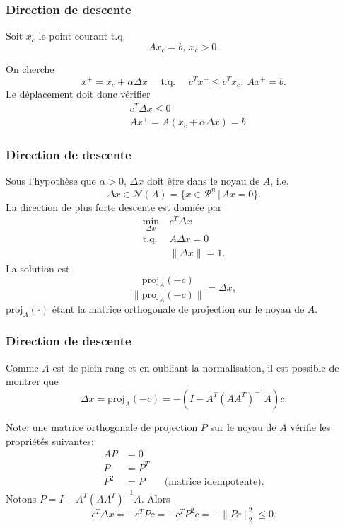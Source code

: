 \documentclass[t,usepdftitle=false]{beamer}
\def\cN{\mathcal{N}}
\def\RR {\mathcal{R}}
\begin{document}
\begin{frame}
	\frametitle{Direction de descente}
	
	Soit $x_c$ le point courant t.q.
	$$
	Ax_c = b, \ x_c > 0.
	$$

	On cherche
	$$
	x^+ = x_c + \alpha \Delta x \quad \text{ t.q. }\quad 
	c^Tx^+ \leq c^T x_c,\ Ax^+ = b.
	$$
	Le déplacement doit donc vérifier
	\begin{align*}
		& c^T \Delta x \leq 0 \\
		& Ax^+ = A(x_c + \alpha \Delta x) = b
	\end{align*}
	
\end{frame}

\begin{frame}
	\frametitle{Direction de descente}
	
	Sous l'hypothèse que $\alpha > 0$, $\Delta x$ doit être dans le noyau de $A$, i.e.
	$$
	\Delta x \in \cN(A) = \{x \in \RR^n \,|\, Ax = 0 \}.
	$$
	La direction de plus forte descente est donnée par
	\begin{align*}
		\min_{\Delta x}\ & c^T\Delta x \\
		\mbox{t.q. } & A \Delta x = 0 \\
		& \| \Delta x \| = 1.
	\end{align*}
	La solution est
	$$
	\frac{\text{proj}_A(-c)}{\| \text{proj}_A (-c) \|} = \Delta x,
	$$
	$\text{proj}_A(\cdot)$ étant la matrice orthogonale de projection sur le
	noyau de $A$.
	
\end{frame}

\begin{frame}
	\frametitle{Direction de descente}
	
	Comme $A$ est de plein rang et en oubliant la normalisation, il est possible de montrer que
	$$
	\Delta x = \text{proj}_A(-c) = -(I - A^T(AA^T)^{-1}A)c.
	$$
	
	\mbox{}
	
	Note: une matrice orthogonale de projection $P$ sur le noyau de $A$ vérifie les propriétés suivantes:
	\begin{align*}
		AP &= 0 \\
		P &= P^T \\
		P^2 &= P\qquad \text{(matrice idempotente)}.
	\end{align*}
	Notons $P = I - A^T(AA^T)^{-1}A$. Alors
$$
		c^T \Delta x = -c^T P c = -c^T P^2 c = - \| Pc \|^2_2 \leq 0.
$$
	
\end{frame}
\end{document}
